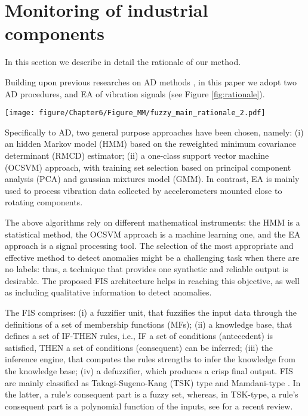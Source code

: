 \section{Monitoring of industrial components}\label{sec:methodologies}
In this section we describe in detail the rationale of our method.


Building upon previous researches on AD methods \cite{sarda2021,russoOCSVM,9589440}, in this paper we adopt two AD procedures, and EA of vibration signals  (see Figure \ref{fig:rationale}). 
%
\begin{figure*}[!ht]
    \centering
    \texttt{[image: figure/Chapter6/Figure\_MM/fuzzy\_main\_rationale\_2.pdf]}
    \caption{Rationale of the proposed methodology.}
    \label{fig:rationale}
\end{figure*}
%
{Specifically to AD}, two general purpose approaches have been chosen, namely: (i) an hidden Markov model (HMM) based on the reweighted minimum covariance determinant (RMCD) estimator; (ii) {a} one-class support vector machine (OCSVM) approach, with  training set selection based on principal component analysis (PCA)  and gaussian mixtures model (GMM). In contrast, EA is mainly used to process vibration data collected by accelerometers mounted close to rotating components.

The above algorithms rely on different mathematical instruments: the HMM is a statistical method, the OCSVM approach is a machine learning one, and the EA approach is a signal processing tool.  {The selection of the most appropriate and effective method to detect anomalies might be a challenging task when there are no labels}: {thus, a technique that provides one synthetic and reliable output is desirable}. The proposed FIS architecture helps in reaching this objective, as well as including qualitative information to detect anomalies.

The FIS comprises: (i) a fuzzifier unit, that fuzzifies the input data through the definitions of a set of membership functions (MFs); (ii) a knowledge base, that defines a set of IF-THEN rules, i.e.,
IF a set of conditions (antecedent) is satisfied, THEN a set of conditions (consequent) can be inferred; (iii) the inference engine, that computes the rules strengths to infer the knowledge from the knowledge base; (iv) a defuzzifier, which produces a crisp final output.
FIS are mainly classified as Takagi-Sugeno-Kang (TSK) type \cite{6313399} {and} Mamdani-type \cite{mamdami}. 
In the latter, a rule’s consequent part is a fuzzy set, whereas, in
TSK-type, a rule’s consequent part is a polynomial function of the inputs, see \cite{OJHA2019845} for a recent review. 


